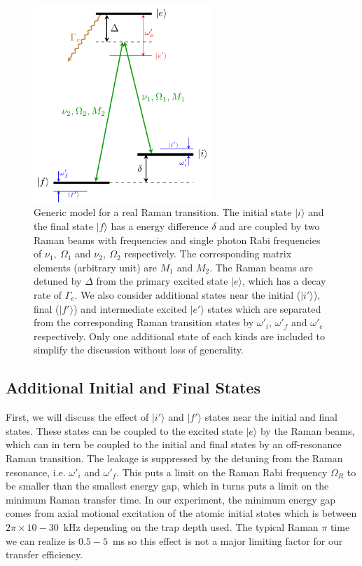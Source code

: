 \begin{figure}
  \centering
  \includegraphics[width=0.6\textwidth]{figures/raman_transfer_generic_raman_model.pdf}
  \caption[Generic model for a real Raman transition]{
    Generic model for a real Raman transition.
    The initial state $|i\rangle$ and the final state $|f\rangle$
    has a energy difference $\delta$
    and are coupled by two Raman beams with frequencies and
    single photon Rabi frequencies of $\nu_1,\ \Omega_1$ and $\nu_2,\ \Omega_2$ respectively.
    The corresponding matrix elements (arbitrary unit) are $M_1$ and $M_2$.
    The Raman beams are detuned by $\Delta$ from the primary excited state $|e\rangle$,
    which has a decay rate of $\Gamma_e$.
    We also consider additional states near the initial ($|i'\rangle$),
    final ($|f'\rangle$) and intermediate excited $|e'\rangle$ states which are
    separated from the corresponding Raman transition states by $\omega'_i$,
    $\omega'_f$ and $\omega'_e$ respectively.
    Only one additional state of each kinds are included to simplify the discussion
    without loss of generality.
    \label{fig:raman-transfer-generic-raman-model}}
\end{figure}

\subsection{Additional Initial and Final States}
\label{ch:raman-transfer:extra-init-final}

First, we will discuss the effect of $|i'\rangle$ and $|f'\rangle$ states
near the initial and final states.
These states can be coupled to the excited state $|e\rangle$ by the Raman beams,
which can in tern be coupled to the initial and final states
by an off-resonance Raman transition.
The leakage is suppressed by the detuning from the Raman resonance,
i.e. $\omega'_i$ and $\omega'_f$.
This puts a limit on the Raman Rabi frequency $\Omega_R$ to be smaller
than the smallest energy gap, which in turns puts a limit on the minimum Raman transfer time.
In our experiment, the minimum energy gap comes from axial motional excitation of
the atomic initial states which is between $2\pi\times10 - 30$~kHz
depending on the trap depth used.
The typical Raman $\pi$ time we can realize is $0.5 - 5$~ms so this effect
is not a major limiting factor for our transfer efficiency.

